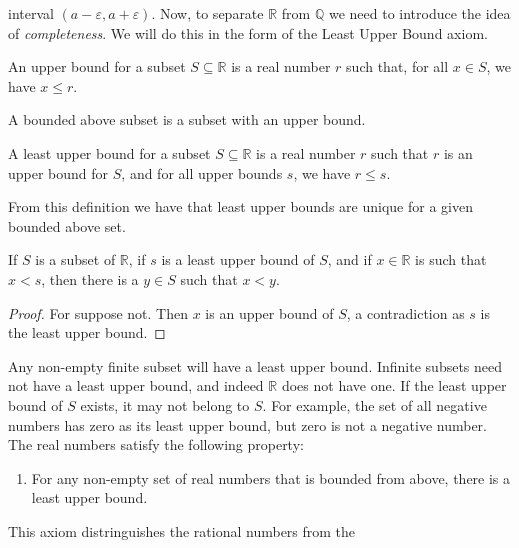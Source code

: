 \documentclass[crop=false,class=book,oneside]{standalone}
\begin{document}
            interval $(a-\varepsilon,a+\varepsilon)$. Now, to
            separate $\mathbb{R}$ from $\mathbb{Q}$ we need
            to introduce the idea of \textit{completeness}.
            We will do this in the form of the Least Upper
            Bound axiom.
            \begin{definition}
                An upper bound for a subset $S\subseteq\mathbb{R}$
                is a real number $r$ such that, for all $x\in{S}$,
                we have $x\leq{r}$.
            \end{definition}
            A bounded above subset is a subset with an upper bound.
            \begin{definition}
                A least upper bound for a subset
                $S\subseteq\mathbb{R}$ is a real number $r$ such
                that $r$ is an upper bound
                for $S$, and for all upper bounds $s$, we have
                $r\leq{s}$.
            \end{definition}
            From this definition we have that least upper bounds are
            unique for a given bounded above set.
            \begin{theorem}
                If $S$ is a subset of $\mathbb{R}$, if $s$ is a
                least upper bound of $S$, and if $x\in\mathbb{R}$
                is such that $x<s$, then there is a $y\in{S}$
                such that $x<y$.
            \end{theorem}
            \begin{proof}
                For suppose not. Then $x$ is an upper bound of $S$,
                a contradiction as $s$ is the least upper bound.
            \end{proof}
            Any non-empty finite subset will have a least
            upper bound. Infinite subsets need not have a least
            upper bound, and indeed $\mathbb{R}$ does not have
            one. If the least upper bound of $S$ exists, it may
            not belong to $S$. For example, the set of all
            negative numbers has zero as its least upper bound,
            but zero is not a negative number. The real
            numbers satisfy the following property:
            \begin{enumerate}
                \item For any non-empty set of real numbers that
                      is bounded from above, there is a least
                      upper bound.
            \end{enumerate}
            This axiom distringuishes the rational numbers from the
\end{document}
